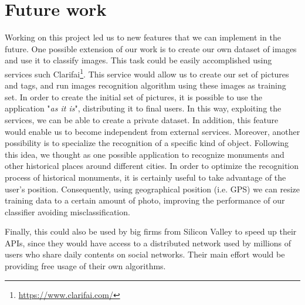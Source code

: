\section{Future work}
\label{sec:future}

Working on this project led us to new features that we can implement in the 
future.
One possible extension of our work is to create our own dataset of images and 
use it to classify images. This task could be easily accomplished using 
services such Clarifai\footnote{\url{https://www.clarifai.com/}}. This service 
would allow us to create our set of pictures and tags, and run images 
recognition algorithm using these images as training set. In order to create the 
initial set of pictures, it is possible to use the application "\textit{as it 
is}", distributing it to final users. In this way, exploiting the services, we 
can be able to create a private dataset. In addition, this feature would enable 
us to become independent from external services.
Moreover, another possibility is to specialize the recognition of a specific 
kind of object. Following this idea, we thought as one possible application to 
recognize monuments and other historical places around different cities. In 
order to optimize the recognition process of historical monuments, it is 
certainly useful to take advantage of the user's position. Consequently, using 
geographical position (i.e. GPS) we can resize training data to a certain amount 
of photo, improving the performance of our classifier avoiding 
misclassification.

Finally, this could also be used by big firms from Silicon Valley to speed up 
their APIs, since they would have access to a distributed network used by 
millions of users who share daily contents on social networks. Their main effort 
would be providing free usage of their own algorithms.